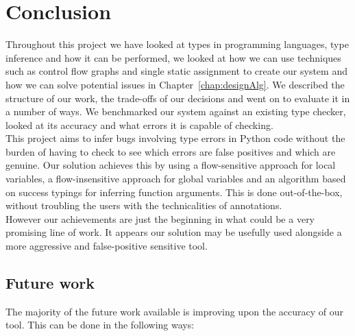 \documentclass[12pt, titlepage]{article}
\begin{document}
\section{Conclusion}
Throughout this project we have looked at types in programming languages, type inference and how it can be performed, we looked at how we can use techniques such as control flow graphs and single static assignment to create our system and how we can solve potential issues in Chapter~\ref{chap:designAlg}. We described the structure of our work, the trade-offs of our decisions and went on to evaluate it in a number of ways. We benchmarked our system against an existing type checker, looked at its accuracy and what errors it is capable of checking. \\
\indent This project aims to infer bugs involving type errors in Python code without the burden of having to check to see which errors are false positives and which are genuine. Our solution achieves this by using a flow-sensitive approach for local variables, a flow-insensitive approach for global variables and an algorithm based on success typings for inferring function arguments. This is done out-of-the-box, without troubling the users with the technicalities of annotations. \\
\indent However our achievements are just the beginning in what could be a very promising line of work. It appears our solution may be usefully used alongside a more aggressive and false-positive sensitive tool.

\subsection{Future work}
The majority of the future work available is improving upon the accuracy of our tool. This can be done in the following ways:
\end{document}
